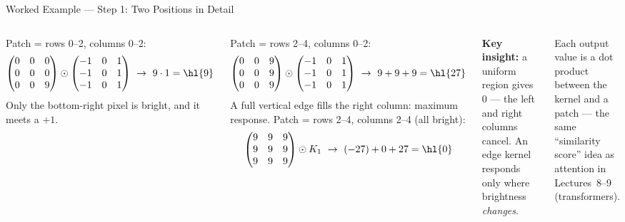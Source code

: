 \documentclass[aspectratio=169,10pt]{beamer}
\begin{document}
\begin{frame}{Worked Example --- Step 1: Two Positions in Detail}
\begin{columns}[T]
\scriptsize Patch = rows 0--2, columns 0--2:
{\footnotesize\[
\begin{pmatrix}0&0&0\\0&0&0\\0&0&9\end{pmatrix}\odot\begin{pmatrix}-1&0&1\\-1&0&1\\-1&0&1\end{pmatrix}
\ \rightarrow\ 9\cdot1=\hl{9}
\]}
\scriptsize Only the bottom-right pixel is bright, and it meets a $+1$.
\vspace{4pt}

\scriptsize Patch = rows 2--4, columns 0--2:
{\footnotesize\[
\begin{pmatrix}0&0&9\\0&0&9\\0&0&9\end{pmatrix}\odot\begin{pmatrix}-1&0&1\\-1&0&1\\-1&0&1\end{pmatrix}
\ \rightarrow\ 9+9+9=\hl{27}
\]}
\scriptsize A full vertical edge fills the right column: maximum response.
\scriptsize Patch = rows 2--4, columns 2--4 (all bright):
\[
\begin{pmatrix}9&9&9\\9&9&9\\9&9&9\end{pmatrix}\odot K_1\ \rightarrow\ (-27)+0+27=\hl{0}
\]
\begin{rbox}\scriptsize\textbf{Key insight:} a uniform region gives 0 --- the left and right columns cancel. An edge kernel responds only where brightness \emph{changes}.\end{rbox}
\begin{ibox}\scriptsize Each output value is a dot product between the kernel and a patch --- the same ``similarity score'' idea as attention in Lectures~8--9 (transformers).\end{ibox}
\end{columns}
\end{frame}
\end{document}
